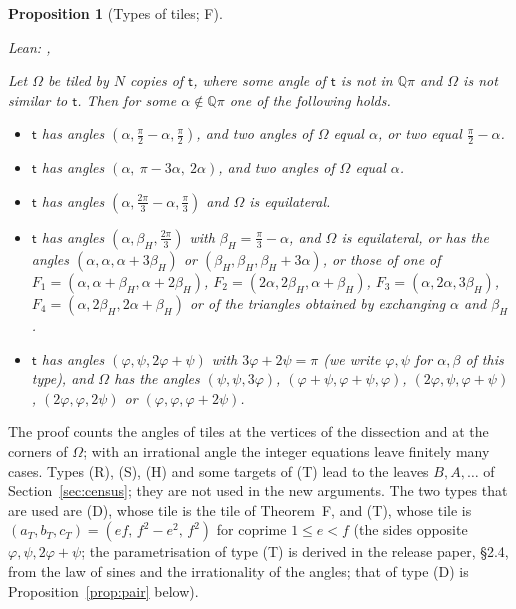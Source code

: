 \documentclass[11pt,reqno]{amsart}
\theoremstyle{plain}
\newtheorem{proposition}[theorem]{Proposition}
\theoremstyle{definition}
\newcommand{\Q}{\mathbb{Q}}
\newcommand{\sF}{\textup{\textsf{F}}}
\begin{document}
\begin{proposition}[Types of tiles; \sF]\label{prop:types}
{\small\noindent\emph{Lean:} , \par}
Let $\Omega$ be tiled by $N$ copies of $\mathsf t$, where some angle of $\mathsf t$ is not in $\Q\pi$ and $\Omega$ is not similar to $\mathsf t$. Then for some $\alpha\notin\Q\pi$ one of the following holds.
\begin{itemize}
\item[\textup{(R)}] $\mathsf t$ has angles $(\alpha,\tfrac\pi2-\alpha,\tfrac\pi2)$, and two angles of $\Omega$ equal $\alpha$, or two equal $\tfrac\pi2-\alpha$.
\item[\textup{(D)}] $\mathsf t$ has angles $(\alpha,\ \pi-3\alpha,\ 2\alpha)$, and two angles of $\Omega$ equal $\alpha$.
\item[\textup{(S)}] $\mathsf t$ has angles $(\alpha,\tfrac{2\pi}3-\alpha,\tfrac\pi3)$ and $\Omega$ is equilateral.
\item[\textup{(H)}] $\mathsf t$ has angles $(\alpha,\beta_H,\tfrac{2\pi}3)$ with $\beta_H=\tfrac\pi3-\alpha$, and $\Omega$ is equilateral, or has the angles $(\alpha,\alpha,\alpha+3\beta_H)$ or $(\beta_H,\beta_H,\beta_H+3\alpha)$, or those of one of $F_1=(\alpha,\alpha+\beta_H,\alpha+2\beta_H)$, $F_2=(2\alpha,2\beta_H,\alpha+\beta_H)$, $F_3=(\alpha,2\alpha,3\beta_H)$, $F_4=(\alpha,2\beta_H,2\alpha+\beta_H)$ or of the triangles obtained by exchanging $\alpha$ and $\beta_H$.
\item[\textup{(T)}] $\mathsf t$ has angles $(\varphi,\psi,2\varphi+\psi)$ with $3\varphi+2\psi=\pi$ (we write $\varphi,\psi$ for $\alpha,\beta$ of this type), and $\Omega$ has the angles $(\psi,\psi,3\varphi)$, $(\varphi+\psi,\varphi+\psi,\varphi)$, $(2\varphi,\psi,\varphi+\psi)$, $(2\varphi,\varphi,2\psi)$ or $(\varphi,\varphi,\varphi+2\psi)$.
\end{itemize}
\end{proposition}
The proof counts the angles of tiles at the vertices of the dissection and at the corners of $\Omega$; with an irrational angle the integer equations leave finitely many cases. Types (R), (S), (H) and some targets of (T) lead to the leaves $B,A,\dots$ of Section~\ref{sec:census}; they are not used in the new arguments. The two types that are used are (D), whose tile is the tile of Theorem~F, and (T), whose tile is $(a_T,b_T,c_T)=(ef,\,f^2-e^2,\,f^2)$ for coprime $1\le e<f$ (the sides opposite $\varphi,\psi,2\varphi+\psi$; the parametrisation of type (T) is derived in the release paper, \S2.4, from the law of sines and the irrationality of the angles; that of type (D) is Proposition~\ref{prop:pair} below).
\end{document}
